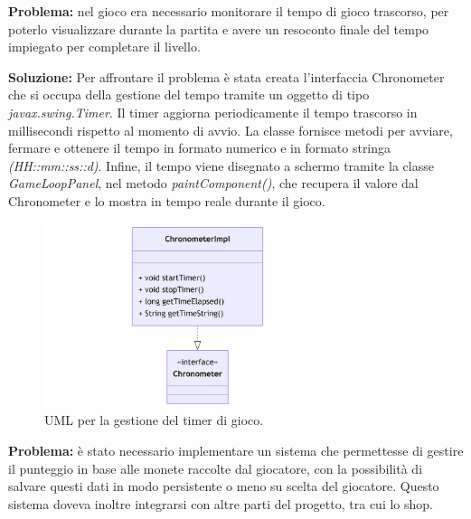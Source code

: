\documentclass[a4paper,12pt]{report}
\begin{document}
\textbf{Problema:} nel gioco era necessario monitorare il tempo di gioco trascorso, per poterlo visualizzare durante la partita e avere un 
resoconto finale del tempo impiegato per completare il livello.

\textbf{Soluzione:} Per affrontare il problema è stata creata l'interfaccia Chronometer che si occupa della gestione del tempo tramite un 
oggetto di tipo \emph{javax.swing.Timer}. Il timer aggiorna periodicamente il tempo trascorso in millisecondi rispetto al momento di avvio. La
classe fornisce metodi per avviare, fermare e ottenere il tempo in formato numerico e in formato stringa \emph{(HH::mm::ss::d)}. Infine, il tempo 
viene disegnato a schermo tramite la classe \emph{GameLoopPanel}, nel metodo \emph{paintComponent()}, che recupera il valore dal Chronometer e lo 
mostra in tempo reale durante il gioco.
\begin{figure}
    \centering
    \includegraphics[width=0.8\textwidth]{resources/UMLtimer.png}
    \caption{UML per la gestione del timer di gioco.}
\end{figure}

\textbf{Problema:} è stato necessario implementare un sistema che permettesse di gestire il punteggio in base alle monete raccolte dal giocatore, con 
la possibilità di salvare questi dati in modo persistente o meno su scelta del giocatore. Questo sistema doveva inoltre integrarsi con altre parti del 
progetto, tra cui lo shop.
\end{document}
